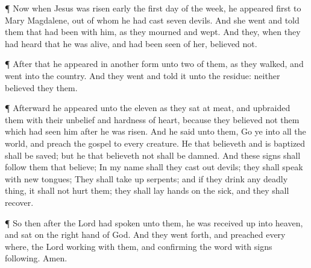  ¶ Now when Jesus was risen early the first day of the week,
he appeared first to Mary Magdalene, out of whom he had cast seven
devils.  And she went and told them that had been with him,
as they mourned and wept.  And they, when they had heard
that he was alive, and had been seen of her, believed not.

 ¶ After that he appeared in another form unto two of them,
as they walked, and went into the country.  And they went
and told it unto the residue: neither believed they them.

 ¶ Afterward he appeared unto the eleven as they sat at
meat, and upbraided them with their unbelief and hardness of heart,
because they believed not them which had seen him after he was risen.
 And he said unto them, Go ye into all the world, and
preach the gospel to every creature.  He that believeth and
is baptized shall be saved; but he that believeth not shall be damned.
 And these signs shall follow them that believe; In my name
shall they cast out devils; they shall speak with new tongues;
 They shall take up serpents; and if they drink any deadly
thing, it shall not hurt them; they shall lay hands on the sick, and
they shall recover.

 ¶ So then after the Lord had spoken unto them, he was
received up into heaven, and sat on the right hand of God. 
And they went forth, and preached every where, the Lord working with
them, and confirming the word with signs following. Amen.
